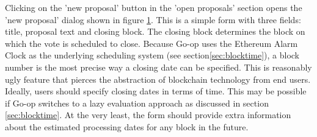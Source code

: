 \begin{figure}
\centering
{}
\decoRule
\caption[]{}
\label{fig:createproposal}
\end{figure}

Clicking on the 'new proposal' button in the 'open proposals' section opens the 'new proposal' dialog shown in figure \ref{fig:createproposal}. This is a simple form with three fields: title, proposal text and closing block. The closing block determines the block on which the vote is scheduled to close. Because Go-op uses the Ethereum Alarm Clock as the underlying scheduling system (see section\ref{sec:blocktime}), a block number is the most precise way a closing date can be specified. This is reasonably ugly feature that pierces the abstraction of blockchain technology from end users. Ideally, users should specify closing dates in terms of time. This may be possible if Go-op switches to a lazy evaluation approach as discussed in section \ref{sec:blocktime}. At the very least, the form should provide extra information about the estimated processing dates for any block in the future. 
 

